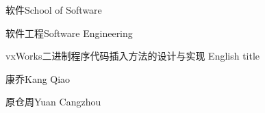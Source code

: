 
\school
{软件}{School of Software}

\major
{软件工程}{Software Engineering}

\thesistitle
{vxWorks二进制程序代码插入方法的设计与实现}
{}
{English title}
{}

\thesisauthor
{康乔}{Kang Qiao}

\teacher
{原仓周}{Yuan Cangzhou}






